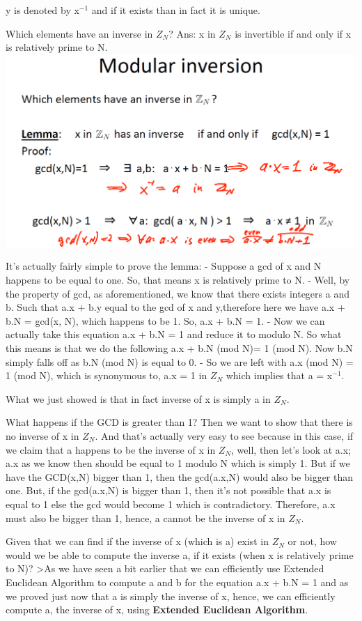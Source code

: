 \documentclass[11pt]{article}
\makeatletter
\def\maxwidth{\ifdim\Gin@nat@width>\linewidth\linewidth
    \else\Gin@nat@width\fi}
\let\Oldincludegraphics\includegraphics
\renewcommand{\includegraphics}[1]{\Oldincludegraphics[width=.8\maxwidth]{#1}}
\makeatother
\begin{document}
y is denoted by x\(^{-1}\) and if it exists than in fact it is unique.

Which elements have an inverse in \(Z_{N}\)? Ans: x in \(Z_{N}\) is
invertible if and only if x is relatively prime to N.
\includegraphics{./Images/NT-ModInverExist.png}

It's actually fairly simple to prove the lemma: - Suppose a gcd of x and
N happens to be equal to one. So, that means x is relatively prime to N.
- Well, by the property of gcd, as aforementioned, we know that there
exists integers a and b. Such that a.x + b.y equal to the gcd of x and
y,therefore here we have a.x + b.N = gcd(x, N), which happens to be 1.
So, a.x + b.N = 1. - Now we can actually take this equation a.x + b.N =
1 and reduce it to modulo N. So what this means is that we do the
following a.x + b.N (mod N)= 1 (mod N). Now b.N simply falls off as b.N
(mod N) is equal to 0. - So we are left with a.x (mod N) = 1 (mod N),
which is synonymous to, a.x = 1 in \(Z_{N}\) which implies that a =
x\(^{-1}\).

What we just showed is that in fact inverse of x is simply a in
\(Z_{N}\).

What happens if the GCD is greater than 1? Then we want to show that
there is no inverse of x in \(Z_{N}\). And that's actually very easy to
see because in this case, if we claim that a happens to be the inverse
of x in \(Z_{N}\), well, then let's look at a.x; a.x as we know then
should be equal to 1 modulo N which is simply 1. But if we have the
GCD(x,N) bigger than 1, then the gcd(a.x,N) would also be bigger than
one. But, if the gcd(a.x,N) is bigger than 1, then it's not possible
that a.x is equal to 1 else the gcd would become 1 which is
contradictory. Therefore, a.x must also be bigger than 1, hence, a
cannot be the inverse of x in \(Z_{N}\).

Given that we can find if the inverse of x (which is a) exist in
\(Z_{N}\) or not, how would we be able to compute the inverse a, if it
exists (when x is relatively prime to N)? \textgreater{}As we have seen
a bit earlier that we can efficiently use Extended Euclidean Algorithm
to compute a and b for the equation a.x + b.N = 1 and as we proved just
now that a is simply the inverse of x, hence, we can efficiently compute
a, the inverse of x, using \textbf{Extended Euclidean Algorithm}.
\end{document}
